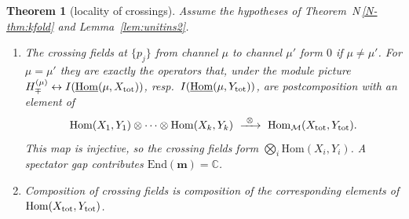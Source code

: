 \documentclass[11pt]{article}
\newtheorem{theorem}{Theorem}[section]
\theoremstyle{definition}
\theoremstyle{remark}
\newcommand{\nref}[1]{N\,\ref{N-#1}}
\begin{document}
\begin{theorem}[locality of crossings]\label{thm:horizontal}
Assume the hypotheses of Theorem~\nref{thm:kfold} and Lemma~\ref{lem:unitins2}.
\begin{enumerate}[nosep,label=(\alph*)]
\item The crossing fields at $\{p_j\}$ from channel $\mu$ to channel $\mu'$ form $0$ if $\mu\ne\mu'$. For $\mu=\mu'$ they are exactly the operators that, under the module picture $H_\mp^{(\mu)}\leftrightarrow I(\underline{\mathrm{Hom}}(\mu,X_{\rm tot}))$, resp.\ $I(\underline{\mathrm{Hom}}(\mu,Y_{\rm tot}))$, are postcomposition with an element of
\[
\mathrm{Hom}(X_1,Y_1)\otimes\cdots\otimes\mathrm{Hom}(X_k,Y_k)\ \xrightarrow{\ \otimes\ }\ \mathrm{Hom}_{\mathcal M}(X_{\rm tot},Y_{\rm tot}).
\]
This map is injective, so the crossing fields form $\bigotimes_i\mathrm{Hom}(X_i,Y_i)$. A spectator gap contributes $\mathrm{End}(\mathbf m)=\mathbb C$.
\item Composition of crossing fields is composition of the corresponding elements of $\mathrm{Hom}(X_{\rm tot},Y_{\rm tot})$.
\end{enumerate}
\end{theorem}
\end{document}
